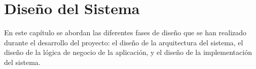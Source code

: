 

\chapter{Diseño del Sistema}
\thispagestyle{chapterpage}

En este capítulo se abordan las diferentes fases de diseño que se 
han realizado durante el desarrollo del proyecto: el diseño de la 
arquitectura del sistema, el diseño de la lógica de negocio de la 
aplicación, y el diseño de la implementación del sistema.





